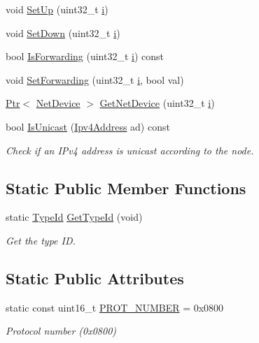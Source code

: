 \begin{DoxyCompactItemize}
\item 
void \hyperlink{classns3_1_1Ipv4L3Protocol_a9c4d254d735b420b7fb6e0a56a90f221}{Set\+Up} (uint32\+\_\+t \hyperlink{lte__uplink__power__control_8m_a6f6ccfcf58b31cb6412107d9d5281426}{i})
\item 
void \hyperlink{classns3_1_1Ipv4L3Protocol_aad57377d10edd4f3de417533d7f07917}{Set\+Down} (uint32\+\_\+t \hyperlink{lte__uplink__power__control_8m_a6f6ccfcf58b31cb6412107d9d5281426}{i})
\item 
bool \hyperlink{classns3_1_1Ipv4L3Protocol_a7edb82af155c25e7325d1c91df7d83de}{Is\+Forwarding} (uint32\+\_\+t \hyperlink{lte__uplink__power__control_8m_a6f6ccfcf58b31cb6412107d9d5281426}{i}) const 
\item 
void \hyperlink{classns3_1_1Ipv4L3Protocol_a4150655165d81cc01cb4ac4883de5c08}{Set\+Forwarding} (uint32\+\_\+t \hyperlink{lte__uplink__power__control_8m_a6f6ccfcf58b31cb6412107d9d5281426}{i}, bool val)
\item 
\hyperlink{classns3_1_1Ptr}{Ptr}$<$ \hyperlink{classns3_1_1NetDevice}{Net\+Device} $>$ \hyperlink{classns3_1_1Ipv4L3Protocol_a783709154b6f41b3a800b3e67369d501}{Get\+Net\+Device} (uint32\+\_\+t \hyperlink{lte__uplink__power__control_8m_a6f6ccfcf58b31cb6412107d9d5281426}{i})
\item 
bool \hyperlink{classns3_1_1Ipv4L3Protocol_a344bf4a2d96c51fc4ff355bb9bd56b30}{Is\+Unicast} (\hyperlink{classns3_1_1Ipv4Address}{Ipv4\+Address} ad) const 
\begin{DoxyCompactList}\small\item\em Check if an I\+Pv4 address is unicast according to the node. \end{DoxyCompactList}\end{DoxyCompactItemize}
\subsection*{Static Public Member Functions}
\begin{DoxyCompactItemize}
\item 
static \hyperlink{classns3_1_1TypeId}{Type\+Id} \hyperlink{classns3_1_1Ipv4L3Protocol_a6ba2da2443b09b292b75aad2a52ecc4b}{Get\+Type\+Id} (void)
\begin{DoxyCompactList}\small\item\em Get the type ID. \end{DoxyCompactList}\end{DoxyCompactItemize}
\subsection*{Static Public Attributes}
\begin{DoxyCompactItemize}
\item 
static const uint16\+\_\+t \hyperlink{classns3_1_1Ipv4L3Protocol_a0146bc84815b7b73adb9c62cdafc9442}{P\+R\+O\+T\+\_\+\+N\+U\+M\+B\+ER} = 0x0800
\begin{DoxyCompactList}\small\item\em Protocol number (0x0800) \end{DoxyCompactList}\end{DoxyCompactItemize}
